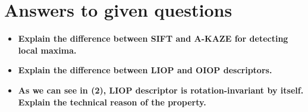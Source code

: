 \begin{easylist}

\end{easylist}

\section{Answers to given questions}

\begin{itemize}
  \item \textbf{Explain the difference between SIFT and A-KAZE for detecting local
    maxima.}
  \item \textbf{Explain the difference between LIOP and OIOP descriptors.}
  \item \textbf{As we can see in (2), LIOP descriptor is rotation-invariant by
    itself.  Explain the technical reason of the property.}
\end{itemize}
